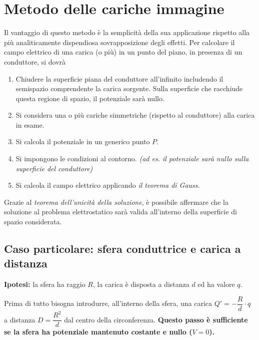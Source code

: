 \documentclass{article}
\begin{document}
\newpage

\section{Metodo delle cariche immagine}
Il vantaggio di questo metodo è la semplicità della sua applicazione rispetto alla più analiticamente dispendiosa sovrapposizione degli effetti.
Per calcolare il campo elettrico di una carica (o più) in un punto del piano, in presenza di un conduttore, si dovrà
\begin{enumerate}
	\item Chiudere la superficie piana del conduttore all'infinito includendo il semispazio comprendente la carica sorgente. Sulla superficie che racchiude questa regione di spazio, il potenziale sarà nullo.
	\item Si considera una o più cariche simmetriche (rispetto al conduttore) alla carica in esame.
	\item Si calcola il potenziale in un generico punto \(P\).
	\item Si impongono le condizioni al contorno. \textit{(ad es. il potenziale sarà nullo sulla superficie del conduttore)}
	\item Si calcola il campo elettrico applicando \textit{il teorema di Gauss.}
\end{enumerate}
Grazie al \textit{teorema dell'unicità della soluzione}, è possibile affermare che la soluzione al problema elettrostatico sarà valida all'interno della superficie di spazio considerata.

\subsection{Caso particolare: sfera conduttrice e carica a distanza}
\textbf{Ipotesi:} la sfera ha raggio \(R\), la carica è disposta a distanza \(d\) ed ha valore \(q\).

Prima di tutto bisogna introdurre, all'interno della sfera, una carica \(Q'  = -\dfrac{R}{d} \cdot q\) a distanza \( D = \dfrac{R^2}{d}\) dal centro della circonferenza. \textbf{Questo passo è sufficiente se la sfera ha potenziale mantenuto costante e nullo (\(V=0\)).} 
\end{document}
